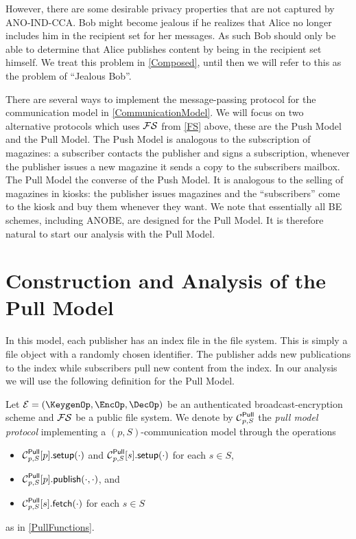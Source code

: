 However, there are some desirable privacy properties that are not captured by 
ANO-IND-CCA\@.
Bob might become jealous if he realizes that Alice no longer includes him in 
the recipient set for her messages.
As such Bob should only be able to determine that Alice publishes content by 
being in the recipient set himself.
We treat this problem in \cref{Composed}, until then we will refer to this as 
the problem of \enquote{Jealous Bob}.

There are several ways to implement the message-passing protocol for the 
communication model in \cref{CommunicationModel}.
We will focus on two alternative protocols which uses \(\FS\) from \cref{FS} 
above, these are the Push Model and the Pull Model.
The Push Model is analogous to the subscription of magazines:
a subscriber contacts the publisher and signs a subscription, whenever the 
publisher issues a new magazine it sends a copy to the subscribers mailbox.
The Pull Model the converse of the Push Model.
It is analogous to the selling of magazines in kiosks:
the publisher issues magazines and the \enquote{subscribers} come to the kiosk 
and buy them whenever they want.
We note that essentially all \ac{BE} schemes, including \ac{ANOBE}, are 
designed for the Pull Model.
It is therefore natural to start our analysis with the Pull Model.


\section{Construction and Analysis of the Pull Model}
\label{PullAnalysis}

In this model, each publisher has an index file in the file system.
This is simply a file object with a randomly chosen identifier.
The publisher adds new publications to the index while subscribers pull new 
content from the index.
In our analysis we will use the following definition for the Pull Model.

\begin{definition}\label{PullModel}
  Let \(\mathcal{E} = (\KeygenOp, \EncOp, \DecOp)\) be an authenticated 
  broadcast-encryption scheme and \(\FS\) be a public file system.
  We denote by \(\Pull[p, S]\) the \emph{pull model protocol} implementing 
  a \((p, S)\)-communication model through the operations
  \begin{itemize}
    \item \(\psetup[p, S]{p}[\cdot]\) and \(\psetup[p, S]{s}[\cdot]\) for each
      \(s\in S\),
    \item \(\ppub[p, S]{p}[\cdot][\cdot]\), and
    \item \(\pget[p, S]{s}[\cdot]\) for each \(s\in S\)
  \end{itemize}
  as in \cref{PullFunctions}.
\end{definition}

